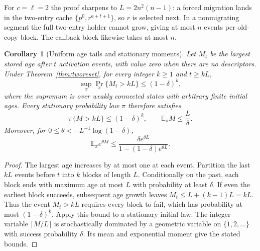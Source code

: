 \documentclass[11pt]{article}
\newtheorem{corollary}[theorem]{Corollary}
\begin{document}
For $c=\ell=2$ the proof sharpens to $L=2n^2(n-1)$:
a forced migration lands in the two-entry cache
$\{p^0,r^{a+t+1}\}$, so $r$ is selected next.
In a nonmigrating segment the full two-entry holder cannot
grow, giving at most $n$ events per old-copy block.
The callback block likewise takes at most $n$.

\begin{corollary}[Uniform age tails and stationary moments]
\label{cor:twotails}
Let $M_t$ be the largest stored age after $t$ activation
events, with value zero when there are no descriptors.
Under Theorem~\ref{thm:tworeset}, for every integer $k\ge1$
and $t\ge kL$,
\[
 \sup_x\Pr_x\{M_t>kL\}\le(1-\delta)^k,
\]
where the supremum is over weakly connected states with
arbitrary finite initial ages. Every stationary probability
law $\pi$ therefore satisfies
\[
 \pi\{M>kL\}\le(1-\delta)^k,\qquad
 \mathbb E_\pi M\le\frac L\delta .
\]
Moreover, for $0\le\theta<-L^{-1}\log(1-\delta)$,
\[
 \mathbb E_\pi e^{\theta M}
 \le\frac{\delta e^{\theta L}}
 {1-(1-\delta)e^{\theta L}}.
\]
\end{corollary}
\begin{proof}
The largest age increases by at most one at each event.
Partition the last $kL$ events before $t$ into $k$ blocks
of length $L$. Conditionally on the past, each block ends
with maximum age at most $L$ with probability at least
$\delta$. If even the earliest block succeeds, subsequent
age growth leaves $M_t\le L+(k-1)L=kL$.
Thus the event $M_t>kL$ requires every block to fail,
which has probability at most $(1-\delta)^k$.
Apply this bound to a stationary initial law. The integer
variable $\lceil M/L\rceil$ is stochastically dominated by
a geometric variable on $\{1,2,\ldots\}$ with success
probability $\delta$. Its mean and exponential moment give
the stated bounds.
\end{proof}
\end{document}
